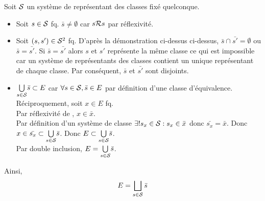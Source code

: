 \documentclass{article}
\renewenvironment{question_kholle}[2][ ]
{
	\subsection{\texorpdfstring{#2}{}}
	\notblank{#1}
	{
		\noindent #1
		\bigbreak
	}
	{}
	\begin{proof}
}
{
	\end{proof}
}
\begin{document}
\begin{question_kholle}
		Soit $\mathcal S$ un système de représentant des classes fixé quelconque.
		
		\begin{itemize}[label=\textemdash]
			\item Soit $s\in \mathcal S$ fq. $\bar{s} \neq \emptyset$ car $s \mathcal R s$ par réflexivité.
			\item Soit $(s, s') \in \mathcal S^2$ fq. D'après la démonstration ci-dessus ci-dessus, $\bar{s} \cap \bar{s'} = \emptyset$ ou $\bar{s} = \bar{s'}$. Si $\bar{s} = \bar{s'}$ alors $s$ et $s'$ représente la même classe ce qui est impossible car un système de représentants des classes contient un unique représentant de chaque classe. Par conséquent, $\bar{s}$ et $\bar{s'}$ sont disjoints.
			\item $\underset{s \in \mathcal S}{\bigcup} \bar{s} \subset E$ car $\forall s \in \mathcal S, \bar{s} \in E$ par définition d'une classe d'équivalence. \\
			Réciproquement, soit $x \in E$ fq. \\
			Par réflexivité de \Rel, $x \in \bar{x}$. \\
			Par définition d'un système de classe $\exists ! s_x \in \mathcal S : s_x \in \bar{x}$ donc $\bar{s_x} = \bar{x}$. Donc $x \in \bar{s_x} \subset \underset{s \in \mathcal S}{\bigcup} \bar{s}$. Donc $E \subset \underset{s \in \mathcal S}{\bigcup} \bar{s}$. \\
			Par double inclusion, $E = \underset{s \in \mathcal S}{\bigcup} \bar{s}$.			
		\end{itemize}
		
		Ainsi,
		\begin{equation}
			E = \bigsqcup_{s \in \mathcal S} \bar{s}
		\end{equation}
		
	\end{question_kholle}
\end{document}
